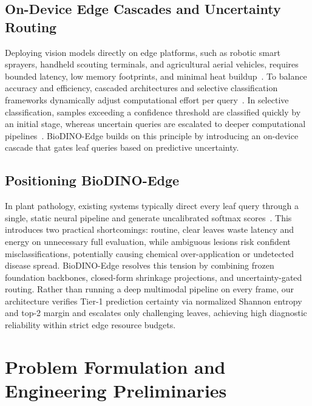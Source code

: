 \documentclass[preprint,12pt]{elsarticle}
\begin{document}
\subsection{On-Device Edge Cascades and Uncertainty Routing}
Deploying vision models directly on edge platforms, such as robotic smart sprayers, handheld scouting terminals, and agricultural aerial vehicles, requires bounded latency, low memory footprints, and minimal heat buildup~\cite{radocaj2025evolution,sharif2026real}. To balance accuracy and efficiency, cascaded architectures and selective classification frameworks dynamically adjust computational effort per query~\cite{geifman2017selective,traub2024overcoming}. In selective classification, samples exceeding a confidence threshold are classified quickly by an initial stage, whereas uncertain queries are escalated to deeper computational pipelines~\cite{geifman2017selective,traub2024overcoming}. BioDINO-Edge builds on this principle by introducing an on-device cascade that gates leaf queries based on predictive uncertainty.

\subsection{Positioning BioDINO-Edge}
In plant pathology, existing systems typically direct every leaf query through a single, static neural pipeline and generate uncalibrated softmax scores~\cite{sharif2026real,zhao2026lightweight}. This introduces two practical shortcomings: routine, clear leaves waste latency and energy on unnecessary full evaluation, while ambiguous lesions risk confident misclassifications, potentially causing chemical over-application or undetected disease spread. BioDINO-Edge resolves this tension by combining frozen foundation backbones, closed-form shrinkage projections, and uncertainty-gated routing. Rather than running a deep multimodal pipeline on every frame, our architecture verifies Tier-1 prediction certainty via normalized Shannon entropy and top-2 margin and escalates only challenging leaves, achieving high diagnostic reliability within strict edge resource budgets.


\section{Problem Formulation and Engineering Preliminaries}
\label{sec:problem_formulation}
\end{document}
